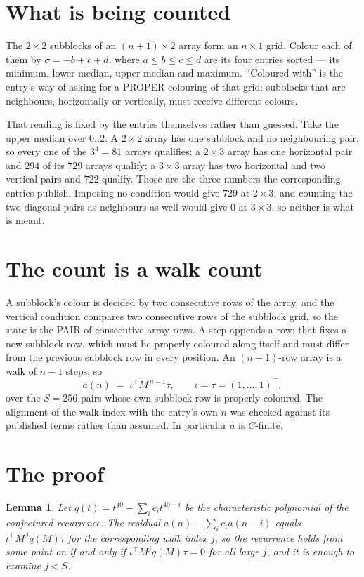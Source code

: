 \documentclass[11pt,a4paper]{article}
\theoremstyle{plain}
\newtheorem{lemma}[theorem]{Lemma}
\theoremstyle{definition}
\begin{document}
\section{What is being counted}

The $2\times2$ subblocks of an $(n+1)\times2$ array form an
$n\times1$ grid. Colour each of them by $\sigma=-b+c+d$, where $a\le b\le c\le d$ are its four entries sorted --- its minimum, lower median, upper median and maximum. ``Coloured with'' is the entry's way of
asking for a PROPER colouring of that grid: subblocks that are neighbours, horizontally or
vertically, must receive different colours.

That reading is fixed by the entries themselves rather than guessed. Take the upper median
over $0..2$. A $2\times2$ array has one subblock and no neighbouring pair, so every one of the
$3^4=81$ arrays qualifies; a $2\times3$ array has one horizontal pair and $294$ of its $729$
arrays qualify; a $3\times3$ array has two horizontal and two vertical pairs and $722$
qualify. Those are the three numbers the corresponding entries publish. Imposing no condition
would give $729$ at $2\times3$, and counting the two diagonal pairs as neighbours as well
would give $0$ at $3\times3$, so neither is what is meant.

\section{The count is a walk count}

A subblock's colour is decided by two consecutive rows of the array, and
the vertical condition compares two consecutive rows of the subblock grid, so the state is the
PAIR of consecutive array rows. A step appends a row: that fixes a new subblock row, which
must be properly coloured along itself and must differ from the previous subblock row in every
position. An $(n+1)$-row array is a walk of $n-1$ steps, so
\[
a(n)\;=\;\iota^{\!\top}M^{\,n-1}\tau,\qquad\iota=\tau=(1,\dots,1)^{\!\top},
\]
over the $S=256$ pairs whose own subblock row is properly coloured.
The alignment of the walk index with the entry's own $n$ was checked against its published
terms rather than assumed. In particular $a$ is $C$-finite.

\section{The proof}

\begin{lemma}\label{lem:crit}
Let $q(t)=t^{40}-\sum_i c_it^{40-i}$ be the characteristic polynomial of the
conjectured recurrence. The residual $a(n)-\sum_ic_ia(n-i)$ equals
$\iota^{\!\top}M^{\,j}q(M)\tau$ for the corresponding walk index $j$, so the recurrence
holds from some point on if and only if $\iota^{\!\top}M^{j}q(M)\tau=0$ for all large $j$,
and it is enough to examine $j<S$.
\end{lemma}
\end{document}
